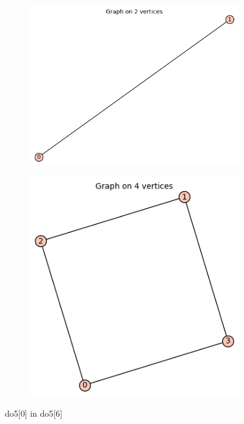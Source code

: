 \documentclass[12pt, a4paper]{article}
\begin{document}
\begin{center}

\begin{figure}
\centering
\begin{subfigure}{0.5\textwidth}
  \centering
  \includegraphics[width=0.5\linewidth]{do5[0]}
\end{subfigure}%
\begin{subfigure}{0.5\textwidth}
  \centering
  \includegraphics[width=0.5\linewidth]{do5[6]}
\end{subfigure}
\caption{do5[0] in do5[6]}
\label{fig:test}
\end{figure}


\end{center}
\end{document}
